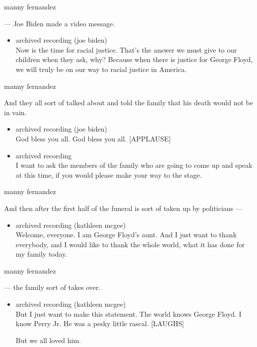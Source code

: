 manny fernandez

--- Joe Biden made a video message.

\begin{itemize}
\tightlist
\item
  archived recording (joe biden)\\
  Now is the time for racial justice. That's the answer we must give to
  our children when they ask, why? Because when there is justice for
  George Floyd, we will truly be on our way to racial justice in
  America.
\end{itemize}

manny fernandez

And they all sort of talked about and told the family that his death
would not be in vain.

\begin{itemize}
\item
  archived recording (joe biden)\\
  God bless you all. God bless you all. {[}APPLAUSE{]}
\item
  archived recording\\
  I want to ask the members of the family who are going to come up and
  speak at this time, if you would please make your way to the stage.
\end{itemize}

manny fernandez

And then after the first half of the funeral is sort of taken up by
politicians ---

\begin{itemize}
\tightlist
\item
  archived recording (kathleen mcgee)\\
  Welcome, everyone. I am George Floyd's aunt. And I just want to thank
  everybody, and I would like to thank the whole world, what it has done
  for my family today.
\end{itemize}

manny fernandez

--- the family sort of takes over.

\begin{itemize}
\item
  archived recording (kathleen mcgee)\\
  But I just want to make this statement. The world knows George Floyd.
  I know Perry Jr. He was a pesky little rascal. {[}LAUGHS{]}

  But we all loved him.
\end{itemize}

